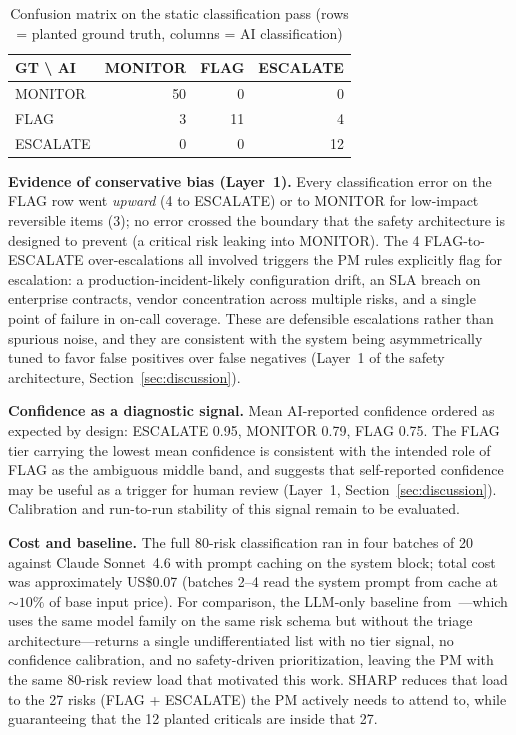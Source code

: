 \documentclass[runningheads]{llncs}
\begin{document}
\begin{table}[htbp]
\caption{Confusion matrix on the static classification pass (rows = planted ground truth, columns = AI classification)}
\label{tab:confusion}
\centering
\begin{tabular}{|l|r|r|r|}
\hline
\textbf{GT \textbackslash{} AI} & \textbf{MONITOR} & \textbf{FLAG} & \textbf{ESCALATE} \\
\hline
MONITOR  & 50 & 0  & 0  \\
\hline
FLAG     & 3  & 11 & 4  \\
\hline
ESCALATE & 0  & 0  & 12 \\
\hline
\end{tabular}
\end{table}

\textbf{Evidence of conservative bias (Layer~1).} Every classification error on the FLAG row went \emph{upward} (4 to ESCALATE) or to MONITOR for low-impact reversible items (3); no error crossed the boundary that the safety architecture is designed to prevent (a critical risk leaking into MONITOR). The 4 FLAG-to-ESCALATE over-escalations all involved triggers the PM rules explicitly flag for escalation: a production-incident-likely configuration drift, an SLA breach on enterprise contracts, vendor concentration across multiple risks, and a single point of failure in on-call coverage. These are defensible escalations rather than spurious noise, and they are consistent with the system being asymmetrically tuned to favor false positives over false negatives (Layer~1 of the safety architecture, Section~\ref{sec:discussion}).

\textbf{Confidence as a diagnostic signal.} Mean AI-reported confidence ordered as expected by design: ESCALATE 0.95, MONITOR 0.79, FLAG 0.75. The FLAG tier carrying the lowest mean confidence is consistent with the intended role of FLAG as the ambiguous middle band, and suggests that self-reported confidence may be useful as a trigger for human review (Layer~1, Section~\ref{sec:discussion}). Calibration and run-to-run stability of this signal remain to be evaluated.

\textbf{Cost and baseline.} The full 80-risk classification ran in four batches of 20 against Claude Sonnet~4.6 with prompt caching on the system block; total cost was approximately US\$0.07 (batches 2--4 read the system prompt from cache at ${\sim}10\%$ of base input price). For comparison, the LLM-only baseline from~\cite{bara2025augmenting}---which uses the same model family on the same risk schema but without the triage architecture---returns a single undifferentiated list with no tier signal, no confidence calibration, and no safety-driven prioritization, leaving the PM with the same 80-risk review load that motivated this work. SHARP reduces that load to the 27 risks (FLAG + ESCALATE) the PM actively needs to attend to, while guaranteeing that the 12 planted criticals are inside that 27.
\end{document}
